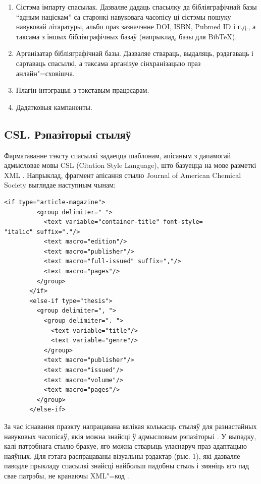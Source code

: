 \documentclass[10pt, a5paper]{article}
\begin{document}
\begin{enumerate}
  \item Сістэма імпарту спасылак. Дазваляе дадаць спасылку да бібліяграфічнай базы ``адным націскам'' са старонкі навуковага часопісу ці сістэмы пошуку навуковай літаратуры, альбо праз зазначэнне DOI, ISBN, Pubmed ID і г.д., а таксама з іншых бібліяграфічных базаў (напрыклад, базы для BibTeX).
  \item Арганізатар бібліяграфічнай базы. Дазваляе ствараць, выдаляць, рэдагаваць і сартаваць спасылкі, а таксама арганізуе сінхранізацыю праз анлайн"=сховішча.
  \item Плагін інтэграцыі з тэкставым працэсарам.
  \item Дадатковыя кампаненты.
\end{enumerate}

\subsection*{CSL. Рэпазіторыі стыляў}

Фарматаванне тэксту спасылкі задаецца шаблонам, апісаным з дапамогай адмысловае мовы CSL (Citation Style Language), што базуецца на мове разметкі XML \cite{Litvinenko1}. Напрыклад, фрагмент апісання стылю Journal of American Chemical Society выглядае наступным чынам:

\begin{verbatim}
<if type="article-magazine">
         <group delimiter=" ">
           <text variable="container-title" font-style=
"italic" suffix="."/>
           <text macro="edition"/>
           <text macro="publisher"/>
           <text macro="full-issued" suffix=","/>
           <text macro="pages"/>
         </group>
       </if>
       <else-if type="thesis">
         <group delimiter=", ">
           <group delimiter=". ">
             <text variable="title"/>
             <text variable="genre"/>
           </group>
           <text macro="publisher"/>
           <text macro="issued"/>
           <text macro="volume"/>
           <text macro="pages"/>
         </group>
       </else-if>
\end{verbatim}

За час існавання праэкту напрацавана вялікая колькасць стыляў для разнастайных навуковых часопісаў, якія можна знайсці ў адмысловым рэпазіторыі \cite{Litvinenko2}. У выпадку, калі патрэбнага стылю бракуе, яго можна стварыць уласнаруч праз адаптацыю наяўных. Для гэтага распрацаваны візуальны рэдактар (рыс. 1), які дазваляе паводле прыкладу спасылкі знайсці найбольш падобны стыль і змяніць яго пад свае патрэбы, не кранаючы XML"=код  \cite{Litvinenko3}.
\end{document}
